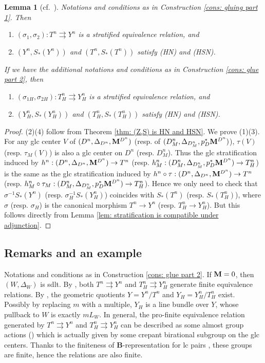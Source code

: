 \documentclass[11pt]{amsart}
\numberwithin{equation}{section}
\newcommand{\Mm}{{\bf{M}}}
\newtheorem{lem}[thm]{Lemma}
\theoremstyle{definition}
\theoremstyle{definition}
\theoremstyle{definition}
\begin{document}
\begin{lem}[{cf.~\cite[Lemma 3.11]{HX13}}]\label{lem: induced relation is stratified}
Notations and conditions as in Construction \ref{cons: gluing part 1}. Then
\begin{enumerate}
    \item $(\sigma_1,\sigma_2): T^n\rightrightarrows Y^n$ is a stratified equivalence relation, and
    \item $(Y^n,S_*(Y^n))$ and $(T^n,S_*(T^n))$ satisfy (HN) and (HSN).
\end{enumerate}
If we have the additional notations and conditions as in Construction \ref{cons: glue part 2}, then\begin{enumerate}
    \item[(3)] $(\sigma_{1H},\sigma_{2H}): T^n_H\rightrightarrows Y^n_H$ is a stratified equivalence relation, and
    \item[(4)] $(Y^n_H,S_*(Y^n_H))$ and $(T^n_H,S_*(T^n_H))$ satisfy (HN) and (HSN).
\end{enumerate}
\end{lem}
\begin{proof}
(2)(4) follow from Theorem \ref{thm: (Z,S) is HN and HSN}. We prove
(1)(3). For any glc center $V$ of $(D^n,\Delta_{D^n},\Mm^{D^n})$ (resp. of $(D^n_M,\Delta_{D^n_M},p^*_D\Mm^{D^n})$), $\tau(V)$ (resp. $\tau_M(V)$) is also a glc center on $D^n$ (resp. $D^n_M$). Thus the glc stratification induced by $h^n: (D^n,\Delta_{D^n},\Mm^{D^n})\to T^n$ (resp. $h^n_M: (D^n_M,\Delta_{D^n_M},p_D^*\Mm^{D^n})\to T^n_H$) is the same as the glc stratification induced by $h^n\circ\tau:(D^n,\Delta_{D^n},\Mm^{D^n})\to T^n$ (resp. $h^n_M\circ\tau_M: (D^n_M,\Delta_{D^n_M},p_D^*\Mm^{D^n})\to T^n_H$). Hence we only need to check that $\sigma^{-1}S_*(Y^n)$ (resp. $\sigma_H^{-1}S_*(Y^n_H)$) coincides with $S_*(T^n)$ (resp. $S_*(T^n_H)$), where $\sigma$ (resp. $\sigma_H$) is the canonical morphism $T^n\to Y^n$ (resp. $T^n_H\to Y^n_H$). But this follows directly from Lemma \ref{lem: stratification is compatible under adjunction}. 
\end{proof}


\subsection{Remarks and an example}
Notations and conditions as in Construction \ref{cons: glue part 2}. If $\Mm=0$, then $(W,\Delta_W)$ is sdlt. By \cite[Section 4]{HX16}, both $T^n\rightrightarrows Y^n$ and $T^n_H\rightrightarrows Y^n_H$ generate finite equivalence relations. By \cite[Theorem 9.21]{Kol13}, the geometric quotients $Y=Y^n/T^n$ and $Y_H=Y^n_H/T^n_H$ exist. Possibly by replacing $m$ with a multiple, $Y_H$ is a line bundle over $Y$, whose pullback to $W$ is exactly $mL_W$. In general, the pro-finite equivalence relation generated by $T^n\rightrightarrows Y^n$ and $T^n_H\rightrightarrows Y^n_H$ can be described as some almost group actions (\cite[Definition 9.32]{Kol13}) which is actually given by some crepant birational subgroup on the glc centers. Thanks to the finiteness of {\bf B}-representation for lc pairs \cite{HX13,FG14}, these groups are finite, hence the relations are also finite. 
\end{document}
